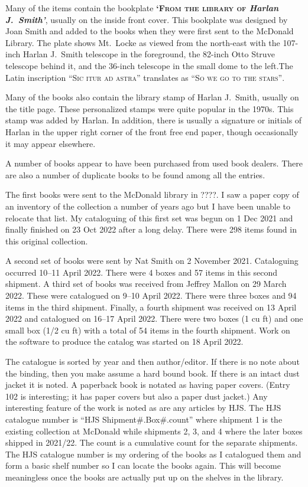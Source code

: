 Many of the items contain the bookplate {\bfseries\textsc{`From the
    library of} \textit{Harlan J.~Smith'}}, usually on the inside front
cover. This bookplate was designed by Joan Smith and added to the
books when they were first sent to the McDonald Library. The plate
shows Mt.~Locke as viewed from the north-east with the 107-inch Harlan
J.~Smith telescope in the foreground, the 82-inch Otto Struve
telescope behind it, and the 36-inch telescope in the small dome to
the left.The Latin inscription \textsc{``Sic itur ad astra''}
translates as \textsc{``So we go to the stars''}.

Many of the books also contain the library stamp of Harlan J.~Smith,
usually on the title page. These personalized stamps were quite
popular in the 1970s. This stamp was added by Harlan. In addition,
there is usually a signature or initials of Harlan in the upper right
corner of the front free end paper, though occasionally it may appear
elsewhere.

A number of books appear to have been purchased from used book dealers.
There are also a number of duplicate books to be found among all the
entries. 

The first books were sent to the McDonald library in ????.  I saw a
paper copy of an inventory of the collection a number of years ago but
I have been unable to relocate that list. My cataloguing of this first
set was begun on 1 Dec 2021 and finally finished on 23 Oct 2022 after
a long delay. There were 298 items found in this original collection.

A second set of books were sent by Nat Smith on 2 November 2021.
Cataloguing occurred 10--11 April 2022. There were 4 boxes and 57 items
in this second shipment. A third set of books was received from
Jeffrey Mallon on 29 March 2022. These were catalogued on 9--10 April
2022. There were three boxes and 94 items in the third
shipment. Finally, a fourth shipment was received on 13 April 2022 and
catalogued on 16--17 April 2022. There were two boxes (1 cu ft) and
one small box (1/2 cu ft) with a total of 54 items in the fourth
shipment.  Work on the software to produce the catalog was started on
18 April 2022.

The catalogue is sorted by year and then author/editor. If there is no
note about the binding, then you make assume a hard bound book. If
there is an intact dust jacket it is noted. A paperback book is
notated as having paper covers. (Entry 102 is interesting; it has
paper covers but also a paper dust jacket.) Any interesting feature of
the work is noted as are any articles by HJS.  The HJS catalogue
number is ``HJS Shipment\#.Box\#.count'' where shipment 1 is the
existing collection at McDonald while shipments 2, 3, and 4 where the
later boxes shipped in 2021/22. The count is a cumulative count for
the separate shipments. The HJS catalogue number is my
ordering of the books as I catalogued them and form a basic shelf
number so I can locate the books again.  This will become meaningless
once the books are actually put up on the shelves in the library.

